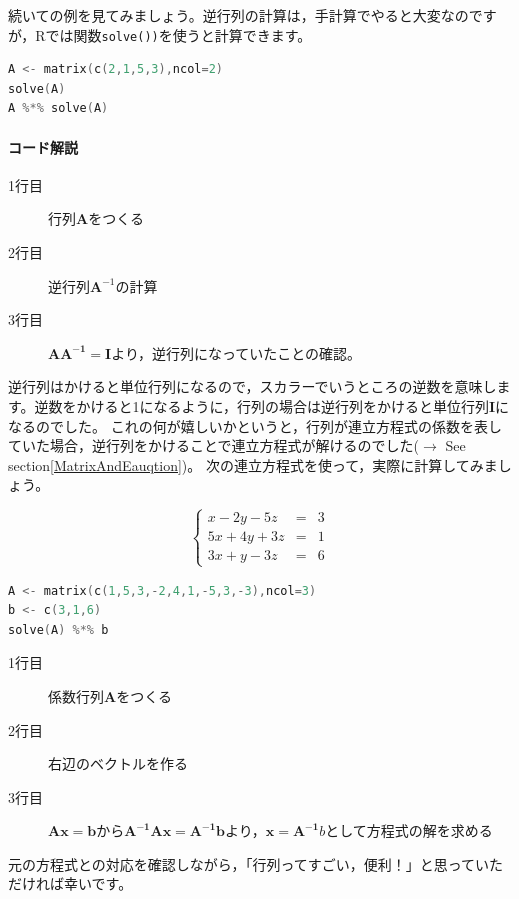 \documentclass{ltjsbook}
\begin{document}
続いての例を見てみましょう。逆行列の計算は，手計算でやると大変なのですが，Rでは関数\texttt{solve())}を使うと計算できます。

\begin{lstlisting}[language=c++,label={code::09_04},caption={逆行列の計算}]
A <- matrix(c(2,1,5,3),ncol=2)
solve(A)
A %*% solve(A)
\end{lstlisting}
\paragraph{コード解説}
\begin{description}
    \item[1行目] 行列$\bm{A}$をつくる
    \item[2行目] 逆行列$\bm{A}^{-1}$の計算
    \item[3行目] $\bm{AA^{-1}}=\bm{I}$より，逆行列になっていたことの確認。
\end{description}

逆行列はかけると単位行列になるので，スカラーでいうところの逆数を意味します。逆数をかけると1になるように，行列の場合は逆行列をかけると単位行列$\bm{I}$になるのでした。
これの何が嬉しいかというと，行列が連立方程式の係数を表していた場合，逆行列をかけることで連立方程式が解けるのでした($\to$ See section\ref{MatrixAndEauqtion})。
次の連立方程式を使って，実際に計算してみましょう。

\[ 
\left \{
					\begin{array}{lcl}
					x-2y-5z&=&3\\
					5x+4y+3z&=&1\\
					3x+y-3z&=&6
					\end{array}
					\right .
\]

\begin{lstlisting}[language=c++,label={code::09_04},caption={連立方程式を解く}]
A <- matrix(c(1,5,3,-2,4,1,-5,3,-3),ncol=3)
b <- c(3,1,6)
solve(A) %*% b
\end{lstlisting}
\begin{description}
    \item[1行目] 係数行列$\bm{A}$をつくる
    \item[2行目] 右辺のベクトルを作る
    \item[3行目] $\bm{Ax}=\bm{b}$から$\bm{A^{-1}Ax}=\bm{A^{-1}b}$より，$\bm{x}=\bm{A^{-1}}b$として方程式の解を求める
\end{description}

元の方程式との対応を確認しながら，「行列ってすごい，便利！」と思っていただければ幸いです。
\end{document}
